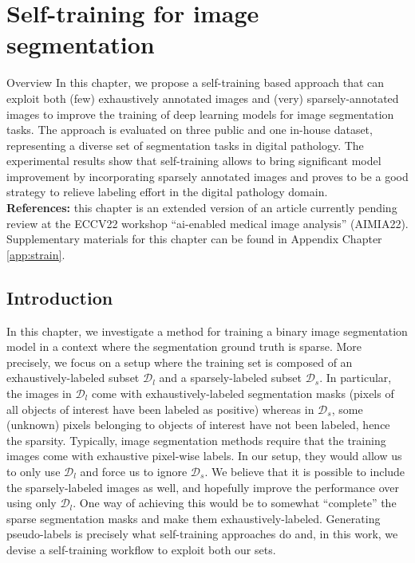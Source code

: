 \chapter{Self-training for image segmentation}
\label{chap:strain}

\begin{overview}{Overview}
  In this chapter, we propose a self-training based approach that can exploit both (few) exhaustively annotated images and (very) sparsely-annotated images to improve the training of deep learning models for image segmentation tasks. The approach is evaluated on three public and one in-house dataset, representing a diverse set of segmentation tasks in digital pathology. The experimental results show that self-training allows to bring significant model improvement by incorporating sparsely annotated images and proves to be a good strategy to relieve labeling effort in the digital pathology domain.\\
  
  \textbf{References:} this chapter is an extended version of an article currently pending review at the ECCV22 workshop ``\acrshort{ai}-enabled medical image analysis'' (AIMIA22). \\
  
  Supplementary materials for this chapter can be found in Appendix Chapter \ref{app:strain}.
  \end{overview}

\section{Introduction}
\label{sec:strain:intro}

In this chapter, we investigate a method for training a binary image segmentation model in a context where the segmentation ground truth is sparse. More precisely, we focus on a setup where the training set is composed of an exhaustively-labeled subset $\mathcal{D}_l$ and a sparsely-labeled subset $\mathcal{D}_s$. In particular, the images in $\mathcal{D}_l$ come with exhaustively-labeled segmentation masks (\ie pixels of all objects of interest have been labeled as positive) whereas in $\mathcal{D}_s$, some (unknown) pixels belonging to objects of interest have not been labeled, hence the sparsity. Typically, image segmentation methods require that the training images come with exhaustive pixel-wise labels. In our setup, they would allow us to only use $\mathcal{D}_l$ and force us to ignore $\mathcal{D}_s$. We believe that it is possible to include the sparsely-labeled images as well, and hopefully improve the performance over using only $\mathcal{D}_l$. One way of achieving this would be to somewhat ``complete'' the sparse segmentation masks and make them exhaustively-labeled. Generating pseudo-labels is precisely what self-training approaches do and, in this work, we devise a self-training workflow to exploit both our sets.

